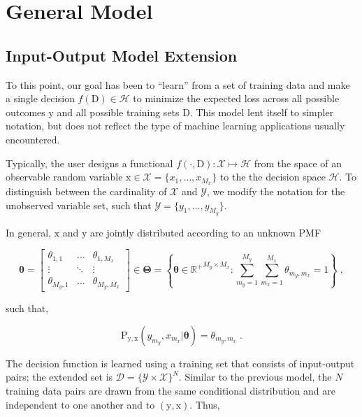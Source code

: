 \documentclass[12pt]{article}
\begin{document}
\section{General Model}

\subsection{Input-Output Model Extension}

To this point, our goal has been to ``learn'' from a set of training data and make a single decision $f(\mathrm{D}) \in \mathcal{H}$ to minimize the expected loss across all possible outcomes $\mathrm{y}$ and all possible training sets $\mathrm{D}$. This model lent itself to simpler notation, but does not reflect the type of machine learning applications usually encountered. 

Typically, the user designs a functional $f(\cdot,\mathrm{D}): \mathcal{X} \mapsto \mathcal{H}$ from the space of an observable random variable $\mathrm{x} \in \mathcal{X} = \{x_1,\ldots,x_{M_x}\}$ to the the decision space $\mathcal{H}$. To distinguish between the cardinality of $\mathcal{X}$ and $\mathcal{Y}$, we modify the notation for the unobserved variable set, such that $\mathcal{Y} = \{y_1,\ldots,y_{M_y}\}$. 

In general, $\mathrm{x}$ and $\mathrm{y}$ are jointly distributed according to an unknown PMF

\begin{equation}
\bm{\theta} = \begin{bmatrix} \theta_{1,1} & \ldots & \theta_{1,M_x} \\ \vdots & \ddots & \vdots \\ \theta_{M_y,1} & \ldots & \theta_{M_y,M_x} \end{bmatrix} 
\in \bm{\Theta} = \left\{ \bm{\theta} \in {\mathbb{R}^+}^{M_y \times M_x}: \sum_{m_y=1}^{M_y} \sum_{m_x=1}^{M_x}  \theta_{m_y,m_x} = 1 \right\} \;,
\end{equation}

such that,

\begin{equation}
\text{P}_{\mathrm{y},\mathrm{x}}(y_{m_y},x_{m_x} | \bm{\theta}) = \theta_{m_y,m_x} \;.
\end{equation}

The decision function is learned using a training set that consists of input-output pairs; the extended set is $\mathcal{D} = \{\mathcal{Y} \times \mathcal{X}\}^N$. Similar to the previous model, the $N$ training data pairs are drawn from the same conditional distribution and are independent to one another and to $(\mathrm{y},\mathrm{x})$. Thus,
\end{document}
